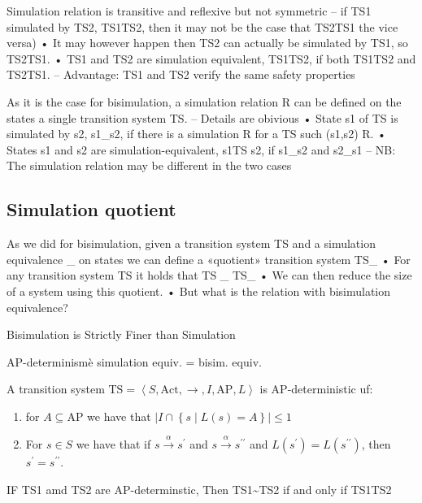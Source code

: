 Simulation relation is transitive and reflexive but not symmetric
– if TS1 simulated by TS2, TS1\leq TS2, then it may not be the case that TS2\leq TS1 the
vice versa)
• It may however happen then TS2 can actually be simulated by TS1, so
TS2\leq TS1.
• TS1 and TS2 are simulation equivalent, TS1\cong TS2, if both TS1\leq TS2 and
TS2\leq TS1.
– Advantage: TS1 and TS2 verify the same safety properties

As it is the case for bisimulation, a simulation relation R can be defined on the
states a single transition system TS.
– Details are obivious
• State s1 of TS is simulated by s2, s1\leq_{}s2, if there is a simulation R for a TS
such (s1,s2) \in R.
• States s1 and s2 are simulation-equivalent, s1\cong TS s2, if s1\leq_{}s2 and s2\leq_{}s1
– NB: The simulation relation may be different in the two cases

\subsection{Simulation quotient}
As we did for bisimulation, given a transition system TS and a simulation
equivalence \cong_{} on states we can define a «quotient» transition system TS_{\setminus\cong}
• For any transition system TS it holds that TS \cong_{} TS_{\setminus\cong}
• We can then reduce the size of a system using this quotient.
• But what is the relation with bisimulation equivalence?

Bisimulation is Strictly Finer than Simulation

AP-determinismè simulation equiv. = bisim. equiv.
\begin{definition}
    A transition system $\text{TS}=\left\langle S,\text{Act},\rightarrow,I,\text{AP},L\right\rangle$ is AP-deterministic uf: 
    \begin{enumerate}
        \item for $A\subseteq\text{AP}$ we have that $\left\lvert I\cap\left\{s\mid L(s)=A\right\}\right\rvert\leq 1$
        \item For $s\in S$ we have that if $s\overset{\alpha}{\rightarrow}s^\prime$ and $s\overset{\alpha}{\rightarrow}s^{\prime\prime}$ and $L(s^\prime)=L(s^{\prime\prime})$, then$s^\prime=s^{\prime\prime}$.
    \end{enumerate}
\end{definition}
\begin{theorem}
    IF TS1 amd TS2 are AP-determinstic, Then TS1\sim TS2 if and only if TS1\simeq  TS2
\end{theorem}

